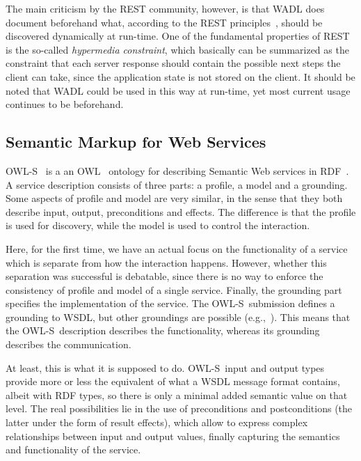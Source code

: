 \documentclass[runningheads,a4paper, twocolumn]{llncs}
\newcommand{\owls}{\mbox{OWL-S}}
\begin{document}
The main criticism by the REST community, however, is that WADL does document beforehand what, according to the REST principles~\cite{FieldingREST}, should be discovered dynamically at run-time. One of the fundamental properties of REST is the so-called \emph{hypermedia constraint}, which basically can be summarized as the constraint that each server response should contain the possible next steps the client can take, since the application state is not stored on the client. It should be noted that WADL could be used in this way at run-time, yet most current usage continues to be beforehand.


\subsection{Semantic Markup for Web Services}

\owls~\cite{OWLS} is a an OWL~\cite{OWL} ontology for describing Semantic Web services in RDF~\cite{RDF}. A service description consists of three parts: a profile, a model and a grounding. Some aspects of profile and model are very similar, in the sense that they both describe input, output, preconditions and effects. The difference is that the profile is used for discovery, while the model is used to control the interaction.

Here, for the first time, we have an actual focus on the functionality of a service which is separate from how the interaction happens. However, whether this separation was successful is debatable, since there is no way to enforce the consistency of profile and model of a single service. Finally, the grounding part specifies the implementation of the service. The \owls\ submission defines a grounding to WSDL, but other groundings are possible (e.g.,~\cite{Verborgh:2010p2746}). This means that the \owls\ description describes the functionality, whereas its grounding describes the communication.

At least, this is what it is supposed to do. \owls\ input and output types provide more or less the equivalent of what a WSDL message format contains, albeit with RDF types, so there is only a minimal added semantic value on that level. The real possibilities lie in the use of preconditions and postconditions (the latter under the form of result effects), which allow to express complex relationships between input and output values, finally capturing the semantics and functionality of the service.
\end{document}

